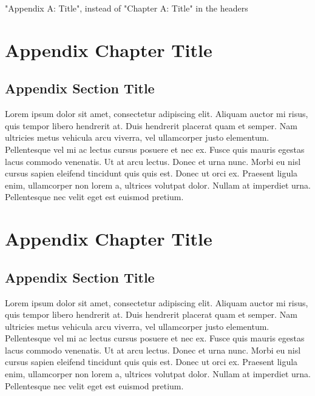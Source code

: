 \documentclass[
	11pt, %
	fleqn, %
	a4paper, %
]{LegrandOrangeBook}
\begin{document}
\begin{appendices}

\renewcommand{\chaptername}{Appendix} %
"Appendix A: Title", instead of "Chapter A: Title" in the headers



\chapter{Appendix Chapter Title}


\section{Appendix Section Title}

Lorem ipsum dolor sit amet, consectetur adipiscing elit.
Aliquam auctor mi risus, quis tempor libero hendrerit at.
Duis hendrerit placerat quam et semper.
Nam ultricies metus vehicula arcu viverra, vel ullamcorper justo elementum.
Pellentesque vel mi ac lectus cursus posuere et nec ex.
Fusce quis mauris egestas lacus commodo venenatis.
Ut at arcu lectus.
Donec et urna nunc.
Morbi eu nisl cursus sapien eleifend tincidunt quis quis est.
Donec ut orci ex.
Praesent ligula enim, ullamcorper non lorem a, ultrices volutpat dolor.
Nullam at imperdiet urna.
Pellentesque nec velit eget est euismod pretium.



\chapter{Appendix Chapter Title}


\section{Appendix Section Title}

Lorem ipsum dolor sit amet, consectetur adipiscing elit.
Aliquam auctor mi risus, quis tempor libero hendrerit at.
Duis hendrerit placerat quam et semper.
Nam ultricies metus vehicula arcu viverra, vel ullamcorper justo elementum.
Pellentesque vel mi ac lectus cursus posuere et nec ex.
Fusce quis mauris egestas lacus commodo venenatis.
Ut at arcu lectus.
Donec et urna nunc.
Morbi eu nisl cursus sapien eleifend tincidunt quis quis est.
Donec ut orci ex.
Praesent ligula enim, ullamcorper non lorem a, ultrices volutpat dolor.
Nullam at imperdiet urna.
Pellentesque nec velit eget est euismod pretium.


\end{appendices}

\end{document}
